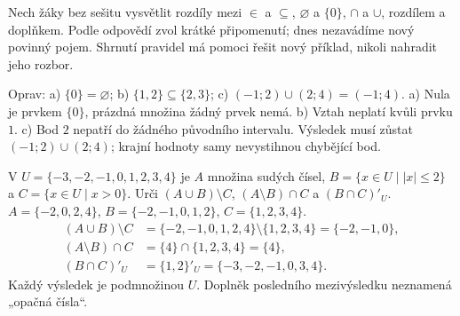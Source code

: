 \documentclass[11pt,a4paper]{article}
\begin{document}
Nech žáky bez sešitu vysvětlit rozdíly mezi $\in$ a $\subseteq$,
$\varnothing$ a $\{0\}$, $\cap$ a $\cup$, rozdílem a doplňkem.
Podle odpovědí zvol krátké připomenutí; dnes nezavádíme nový povinný pojem.
Shrnutí pravidel má pomoci řešit nový příklad, nikoli nahradit jeho rozbor.

\begin{prikladReseniBox}[title={P1: tři modelové chyby},breakable=false]
Oprav: a) $\{0\}=\varnothing$; b) $\{1,2\}\subseteq\{2,3\}$;
c) $(-1;2)\cup(2;4)=(-1;4)$.
\tcblower
a) Nula je prvkem $\{0\}$, prázdná množina žádný prvek nemá.
b) Vztah neplatí kvůli prvku $1$.
c) Bod $2$ nepatří do žádného původního intervalu. Výsledek musí zůstat
$(-1;2)\cup(2;4)$; krajní hodnoty samy nevystihnou chybějící bod.
\end{prikladReseniBox}

\begin{prikladReseniBox}[title={P2: složitější výraz rozlož na kroky},breakable=false]
V $U=\{-3,-2,-1,0,1,2,3,4\}$ je $A$ množina sudých čísel,
$B=\{x\in U\mid |x|\le2\}$ a $C=\{x\in U\mid x>0\}$.
Urči $(A\cup B)\setminus C$, $(A\setminus B)\cap C$ a $(B\cap C)'_U$.
\tcblower
$A=\{-2,0,2,4\}$, $B=\{-2,-1,0,1,2\}$, $C=\{1,2,3,4\}$.
\begin{align*}
(A\cup B)\setminus C
 &=\{-2,-1,0,1,2,4\}\setminus\{1,2,3,4\}=\{-2,-1,0\},\\
(A\setminus B)\cap C&=\{4\}\cap\{1,2,3,4\}=\{4\},\\
(B\cap C)'_U&=\{1,2\}'_U=\{-3,-2,-1,0,3,4\}.
\end{align*}
Každý výsledek je podmnožinou $U$. Doplněk posledního mezivýsledku
neznamená „opačná čísla“.
\end{prikladReseniBox}
\end{document}
